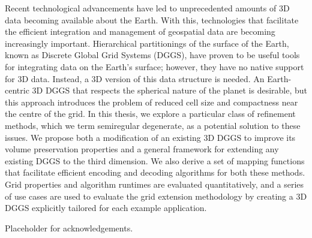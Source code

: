 %
\newpage
{}
{}
Recent technological advancements have led to unprecedented amounts of 3D data becoming available about the Earth.
With this, technologies that facilitate the efficient integration and management of geospatial data are becoming increasingly important.
Hierarchical partitionings of the surface of the Earth, known as Discrete Global Grid Systems (DGGS), have proven to be useful tools for integrating data on the Earth's surface; however, they have no native support for 3D data.
Instead, a 3D version of this data structure is needed.
An Earth-centric 3D DGGS that respects the spherical nature of the planet is desirable, but this approach introduces the problem of reduced cell size and compactness near the centre of the grid.
In this thesis, we explore a particular class of refinement methods, which we term semiregular degenerate, as a potential solution to these issues.
We propose both a modification of an existing 3D DGGS to improve its volume preservation properties and a general framework for extending any existing DGGS to the third dimension.
We also derive a set of mapping functions that facilitate efficient encoding and decoding algorithms for both these methods.
Grid properties and algorithm runtimes are evaluated quantitatively, and a series of use cases are used to evaluate the grid extension methodology by creating a 3D DGGS explicitly tailored for each example application.

\newpage
{}
{}
Placeholder for acknowledgements.

\begin{singlespace}
\newpage
{}
\tableofcontents
\pagestyle{plain}
\newpage
{}
\listoftables
\pagestyle{plain}
\newpage
{}
\listoffigures
\pagestyle{plain}
\clearpage
\clearpage          %
\end{singlespace}
